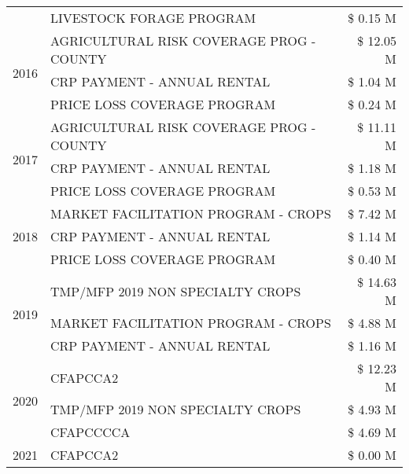 \begin{tabular}{llr}
 & LIVESTOCK FORAGE PROGRAM & \$ 0.15 M \\
\cline{1-3}
\multirow[t]{3}{*}{2016} & AGRICULTURAL RISK COVERAGE PROG - COUNTY & \$ 12.05 M \\
 & CRP PAYMENT - ANNUAL RENTAL & \$ 1.04 M \\
 & PRICE LOSS COVERAGE PROGRAM & \$ 0.24 M \\
\cline{1-3}
\multirow[t]{3}{*}{2017} & AGRICULTURAL RISK COVERAGE PROG - COUNTY & \$ 11.11 M \\
 & CRP PAYMENT - ANNUAL RENTAL & \$ 1.18 M \\
 & PRICE LOSS COVERAGE PROGRAM & \$ 0.53 M \\
\cline{1-3}
\multirow[t]{3}{*}{2018} & MARKET FACILITATION PROGRAM - CROPS & \$ 7.42 M \\
 & CRP PAYMENT - ANNUAL RENTAL & \$ 1.14 M \\
 & PRICE LOSS COVERAGE PROGRAM & \$ 0.40 M \\
\cline{1-3}
\multirow[t]{3}{*}{2019} & TMP/MFP 2019 NON SPECIALTY CROPS & \$ 14.63 M \\
 & MARKET FACILITATION PROGRAM - CROPS & \$ 4.88 M \\
 & CRP PAYMENT - ANNUAL RENTAL & \$ 1.16 M \\
\cline{1-3}
\multirow[t]{3}{*}{2020} & CFAPCCA2 & \$ 12.23 M \\
 & TMP/MFP 2019 NON SPECIALTY CROPS & \$ 4.93 M \\
 & CFAPCCCCA & \$ 4.69 M \\
\cline{1-3}
2021 & CFAPCCA2 & \$ 0.00 M \\
\cline{1-3}
\bottomrule
\end{tabular}
